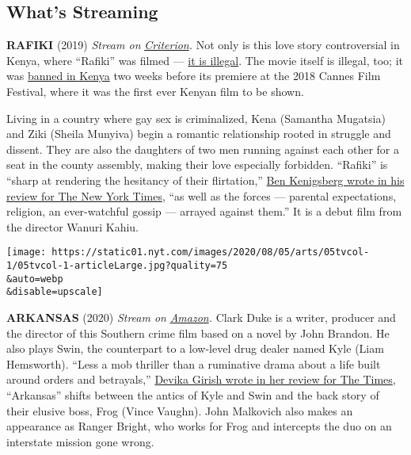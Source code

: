 \hypertarget{whats-streaming}{%
\subsection{What's Streaming}\label{whats-streaming}}

\textbf{RAFIKI} (2019) \emph{Stream on}
\href{https://www.criterionchannel.com/rafiki}{\emph{Criterion}}\emph{.}
Not only is this love story controversial in Kenya, where ``Rafiki'' was
filmed ---
\href{https://www.npr.org/2019/05/24/726541735/kenyas-judges-uphold-laws-that-criminalize-gay-sex}{it
is illegal}. The movie itself is illegal, too; it was
\href{https://www.nytimes.com/2018/04/27/world/africa/kenya-cannes-film-lesbians-banned.html}{banned
in Kenya} two weeks before its premiere at the 2018 Cannes Film
Festival, where it was the first ever Kenyan film to be shown.

Living in a country where gay sex is criminalized, Kena (Samantha
Mugatsia) and Ziki (Sheila Munyiva) begin a romantic relationship rooted
in struggle and dissent. They are also the daughters of two men running
against each other for a seat in the county assembly, making their love
especially forbidden. ``Rafiki'' is ``sharp at rendering the hesitancy
of their flirtation,''
\href{https://www.nytimes.com/2019/04/18/movies/rafiki-review.html}{Ben
Kenigsberg wrote in his review for The New York Times}, ``as well as the
forces --- parental expectations, religion, an ever-watchful gossip ---
arrayed against them.'' It is a debut film from the director Wanuri
Kahiu.

\texttt{[image: https://static01.nyt.com/images/2020/08/05/arts/05tvcol-1/05tvcol-1-articleLarge.jpg?quality=75\\\&auto=webp\\\&disable=upscale]}

\textbf{ARKANSAS} (2020) \emph{Stream on}
\href{https://www.amazon.com/Arkansas-Liam-Hemsworth/dp/B085NNRX6J}{\emph{Amazon}}\emph{.}
Clark Duke is a writer, producer and the director of this Southern crime
film based on a novel by John Brandon. He also plays Swin, the
counterpart to a low-level drug dealer named Kyle (Liam Hemsworth).
``Less a mob thriller than a ruminative drama about a life built around
orders and betrayals,''
\href{https://www.nytimes.com/2020/05/07/movies/arkansas-review.html}{Devika
Girish wrote in her review for The Times}, ``Arkansas'' shifts between
the antics of Kyle and Swin and the back story of their elusive boss,
Frog (Vince Vaughn). John Malkovich also makes an appearance as Ranger
Bright, who works for Frog and intercepts the duo on an interstate
mission gone wrong.

